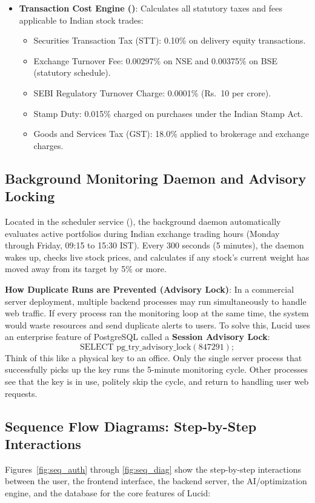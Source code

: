 \begin{itemize}
    \item \textbf{Transaction Cost Engine ()}: Calculates all statutory taxes and fees applicable to Indian stock trades:
    \begin{itemize}
        \item Securities Transaction Tax (STT): 0.10\% on delivery equity transactions.
        \item Exchange Turnover Fee: 0.00297\% on NSE and 0.00375\% on BSE (statutory schedule).
        \item SEBI Regulatory Turnover Charge: 0.0001\% (Rs.~10 per crore).
        \item Stamp Duty: 0.015\% charged on purchases under the Indian Stamp Act.
        \item Goods and Services Tax (GST): 18.0\% applied to brokerage and exchange charges.
    \end{itemize}
\end{itemize}

\subsection{Background Monitoring Daemon and Advisory Locking}
Located in the scheduler service (), the background daemon automatically evaluates active portfolios during Indian exchange trading hours (Monday through Friday, 09:15 to 15:30 IST). Every 300 seconds (5 minutes), the daemon wakes up, checks live stock prices, and calculates if any stock's current weight has moved away from its target by 5\% or more.

\textbf{How Duplicate Runs are Prevented (Advisory Lock)}:
In a commercial server deployment, multiple backend processes may run simultaneously to handle web traffic. If every process ran the monitoring loop at the same time, the system would waste resources and send duplicate alerts to users.
To solve this, Lucid uses an enterprise feature of PostgreSQL called a \textbf{Session Advisory Lock}:
\[
\text{SELECT pg\_try\_advisory\_lock}(847291);
\]
Think of this like a physical key to an office. Only the single server process that successfully picks up the key runs the 5-minute monitoring cycle. Other processes see that the key is in use, politely skip the cycle, and return to handling user web requests.

\subsection{Sequence Flow Diagrams: Step-by-Step Interactions}
Figures~\ref{fig:seq_auth} through \ref{fig:seq_diag} show the step-by-step interactions between the user, the frontend interface, the backend server, the AI/optimization engine, and the database for the core features of Lucid:

